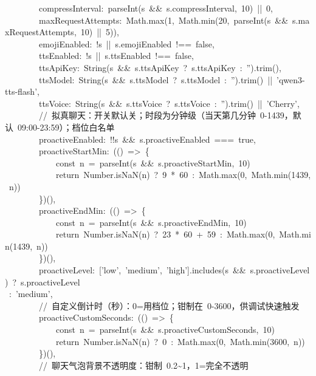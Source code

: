 \documentclass[a4paper,10pt]{article}
\begin{document}
{\ttfamily\footnotesize\raggedright
~~~~~~~~compressInterval:~parseInt(s~\&\&~s.compressInterval,~10)~||~0,\\
~~~~~~~~maxRequestAttempts:~Math.max(1,~Math.min(20,~parseInt(s~\&\&~s.maxRequestAttempts,~10)~||~5)),\\
~~~~~~~~emojiEnabled:~!s~||~s.emojiEnabled~!==~false,\\
~~~~~~~~ttsEnabled:~!s~||~s.ttsEnabled~!==~false,\\
~~~~~~~~ttsApiKey:~String(s~\&\&~s.ttsApiKey~?~s.ttsApiKey~:~'').trim(),\\
~~~~~~~~ttsModel:~String(s~\&\&~s.ttsModel~?~s.ttsModel~:~'').trim()~||~'qwen3-tts-flash',\\
~~~~~~~~ttsVoice:~String(s~\&\&~s.ttsVoice~?~s.ttsVoice~:~'').trim()~||~'Cherry',\\
~~~~~~~~//~拟真聊天：开关默认关；时段为分钟级（当天第几分钟~0-1439，默认~09:00-23:59）；档位白名单\\
~~~~~~~~proactiveEnabled:~!!s~\&\&~s.proactiveEnabled~===~true,\\
~~~~~~~~proactiveStartMin:~(()~=>~\{\\
~~~~~~~~~~~~const~n~=~parseInt(s~\&\&~s.proactiveStartMin,~10)\\
~~~~~~~~~~~~return~Number.isNaN(n)~?~9~*~60~:~Math.max(0,~Math.min(1439,~n))\\
~~~~~~~~\})(),\\
~~~~~~~~proactiveEndMin:~(()~=>~\{\\
~~~~~~~~~~~~const~n~=~parseInt(s~\&\&~s.proactiveEndMin,~10)\\
~~~~~~~~~~~~return~Number.isNaN(n)~?~23~*~60~+~59~:~Math.max(0,~Math.min(1439,~n))\\
~~~~~~~~\})(),\\
~~~~~~~~proactiveLevel:~['low',~'medium',~'high'].includes(s~\&\&~s.proactiveLevel)~?~s.proactiveLevel\\
~:~'medium',\\
~~~~~~~~//~自定义倒计时（秒）：0=用档位；钳制在~0-3600，供调试快速触发\\
~~~~~~~~proactiveCustomSeconds:~(()~=>~\{\\
~~~~~~~~~~~~const~n~=~parseInt(s~\&\&~s.proactiveCustomSeconds,~10)\\
~~~~~~~~~~~~return~Number.isNaN(n)~?~0~:~Math.max(0,~Math.min(3600,~n))\\
~~~~~~~~\})(),\\
~~~~~~~~//~聊天气泡背景不透明度：钳制~0.2\textasciitilde{}1，1=完全不透明\\
}
\end{document}
